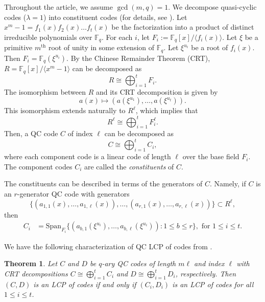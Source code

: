 \documentclass[12 pt]{extarticle}
\numberwithin{equation}{section}
\newtheorem{theorem}{Theorem}[section]
\theoremstyle{definition}
\begin{document}
Throughout the article, we assume $\gcd(m,q)=1$.  We decompose quasi-cyclic codes ($\lambda=1$) into constituent codes (for details, see \cite[Chapter 7, Quasi-cyclic codes p.132]{Huffman2021}). Let $x^m-1=f_1(x)f_2(x)\dots f_t(x)$ be the factorization into a product of distinct irreducible polynomials over $\mathbb{F}_q$. For each $i$,  let $F_i:=\mathbb{F}_q[x]/\langle f_i(x) \rangle$. 
Let $\xi$ be a primitive $m^{\text{th}}$ root of unity in some extension of $\mathbb{F}_q$. Let $\xi^{u_i}$ be a root of $f_i(x)$.
Then $F_i= \mathbb{F}_q(\xi^{u_i})$. By the Chinese
 Remainder Theorem (CRT), $R=\mathbb{F}_q[x]/\langle x^m-1\rangle$ can be decomposed as
 $$
R \cong \bigoplus_{i=1}^{t} F_i.
 $$ 
The isomorphism between $R$ and its CRT decomposition is given by 
\[
a(x) \mapsto \left(a(\xi^{u_1}), \dots, a(\xi^{u_t})\right). 
\]
This isomorphism extends naturally to  $R^\ell$, which implies that
 $$
R^\ell \cong \bigoplus_{i=1}^{t} F_i^\ell.
 $$ 
Then, a QC code $C$ of index $\ell$ can be  decomposed as 
\begin{equation} \label{crtC}
C \cong \bigoplus_{i=1}^{t} C_i, 
\end{equation} 
where each component code is a linear code of length $\ell$ over the base field $F_i$.  The component codes  $C_i$ are called the \textit{constituents} of $C$.

The constituents can be described in terms of the generators of $C$. Namely, if $ C$ is an $r$-generator QC code with generators
\[
 \{ (a_{1,1}(x),\dots ,a_{1,\ell}(x)) ,\dots, (a_{r,1}(x),\dots,a_{r,\ell} (x) ) \} \subset R^\ell,
\]
then 
\begin{align*}
C_i &= \text{Span}_{F_i} \{ (a_{b,1}(\xi^{u_i}),\dots ,a_{b,\ell}(\xi^{u_i})) : 1 \le b \le r \}, \text{ for } 1 \le i \le t.
\end{align*}

We have the following characterization of  QC LCP of codes from \cite[Theorem 3.1]{carlet2018}. 


\begin{theorem} \label{qclcp} Let $C$ and $D$ be  $q$-ary QC codes of length $m\ell$ and index $\ell$ with  CRT decompositions  $C \cong \bigoplus_{i=1}^{t} C_i$  and $D \cong \bigoplus_{i=1}^{t} D_i$, respectively.
Then $(C,D)$ is an LCP of codes if and only if 
$(C_i, D_i)$ is an LCP of codes for all $1\leq i\leq t$. 
 \end{theorem}
\end{document}
